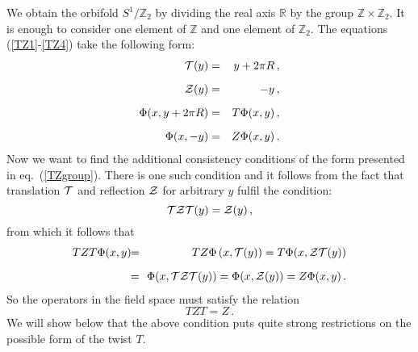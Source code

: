 \documentclass[a4paper,12pt]{article}
\def\nn{\nonumber}
\def\cT{{\cal T}}
\def\cZ{{\cal Z}}
\def\RR{\mathbb R}
\def\ZZ{\mathbb Z}
\begin{document}
We obtain the orbifold $S^1/\ZZ_2$ by dividing  the real axis $\RR$ by
the group $\ZZ\times\ZZ_2$. It is enough to consider one element of
$\ZZ$ and one element of $\ZZ_2$. The equations (\ref{TZ1}-\ref{TZ4})
take the following form:
\begin{eqnarray}
\cT(y)&=&y+2\pi R
\,,
\label{S1Z2a}\\[6pt]
\cZ(y)&=&-y
\,,
\label{S1Z2b}\\[6pt]
\Phi(x,y+2\pi R)&=&T\Phi(x,y)
\,,
\label{S1Z2c}\\[6pt]
\Phi(x,-y)&=&Z\Phi(x,y)
\,.
\label{S1Z2d}
\end{eqnarray}
Now we want to find the additional consistency conditions of the form
presented in eq.\ (\ref{TZgroup}). There is one such condition and it
follows from the fact that translation $\cT$ and reflection $\cZ$ for
arbitrary $y$ fulfil the condition:
\begin{equation}
\cT\cZ\cT(y)=\cZ(y)
\,,
\end{equation}
from which it follows that
\begin{eqnarray}
TZT\Phi(x,y)
&\!\!=\!\!&
TZ\Phi\left(x,\cT(y)\right)=T\Phi(x,\cZ\cT(y))
\nn\\[6pt]
&\!\!=\!\!&
\Phi(x,\cT\cZ\cT(y))=\Phi(x,\cZ(y))=Z\Phi(x,y)
\,.
\end{eqnarray}
So the operators in the field space must satisfy the relation 
\begin{equation} 
TZT=Z
\,.
\label{TZT}
\end{equation}
We will show below that the above condition puts quite strong
restrictions on the possible form of the twist $T$.
\end{document}
